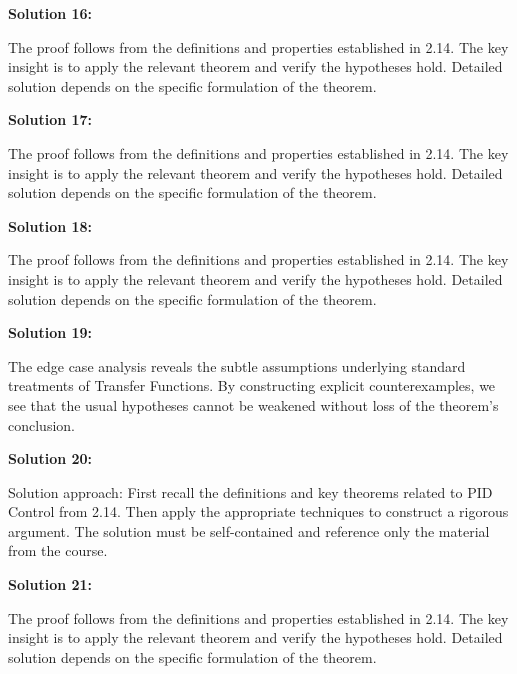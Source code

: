 \documentclass[12pt,a4paper]{exam}
\begin{document}
\vspace{0.5cm}

\textbf{Solution 16:}

The proof follows from the definitions and properties established in 2.14. The key insight is to apply the relevant theorem and verify the hypotheses hold. Detailed solution depends on the specific formulation of the theorem.

\vspace{0.5cm}

\textbf{Solution 17:}

The proof follows from the definitions and properties established in 2.14. The key insight is to apply the relevant theorem and verify the hypotheses hold. Detailed solution depends on the specific formulation of the theorem.

\vspace{0.5cm}

\textbf{Solution 18:}

The proof follows from the definitions and properties established in 2.14. The key insight is to apply the relevant theorem and verify the hypotheses hold. Detailed solution depends on the specific formulation of the theorem.

\vspace{0.5cm}

\textbf{Solution 19:}

The edge case analysis reveals the subtle assumptions underlying standard treatments of Transfer Functions. By constructing explicit counterexamples, we see that the usual hypotheses cannot be weakened without loss of the theorem's conclusion.

\vspace{0.5cm}

\textbf{Solution 20:}

Solution approach: First recall the definitions and key theorems related to PID Control from 2.14. Then apply the appropriate techniques to construct a rigorous argument. The solution must be self-contained and reference only the material from the course.

\vspace{0.5cm}

\textbf{Solution 21:}

The proof follows from the definitions and properties established in 2.14. The key insight is to apply the relevant theorem and verify the hypotheses hold. Detailed solution depends on the specific formulation of the theorem.
\end{document}
